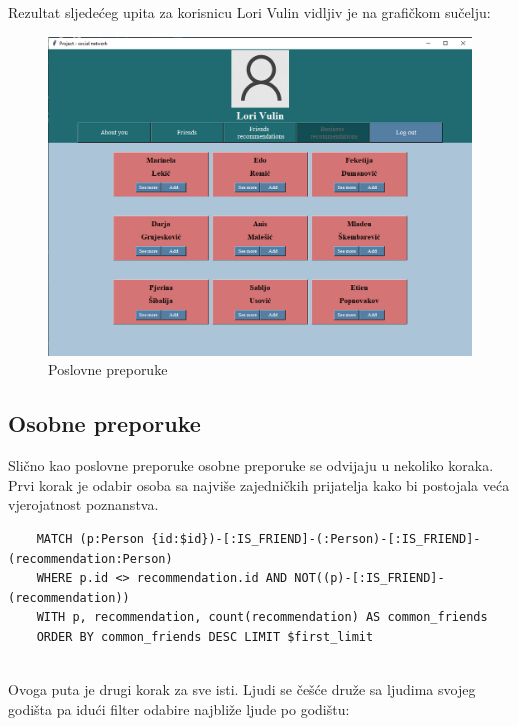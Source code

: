 \documentclass[titlepage, 12pt]{scrartcl}
\begin{document}
	\newpage
    \begin{samepage}
    Rezultat sljedećeg upita za korisnicu Lori Vulin vidljiv je na grafičkom sučelju:
    
    \begin{figure}[h!]
        \centering
        \includegraphics[scale=0.4]{slike/business.jpg}
        \caption{Poslovne preporuke}
        \label{fig:business_rec}
    \end{figure}
    
    \subsection{Osobne preporuke}
    Slično kao poslovne preporuke osobne preporuke se odvijaju u nekoliko koraka. \\
    Prvi korak je odabir osoba sa najviše zajedničkih prijatelja kako bi postojala veća vjerojatnost poznanstva.
    \begin{samepage}
    \begin{verbatim}
    MATCH (p:Person {id:$id})-[:IS_FRIEND]-(:Person)-[:IS_FRIEND]-(recommendation:Person)
    WHERE p.id <> recommendation.id AND NOT((p)-[:IS_FRIEND]-(recommendation))
    WITH p, recommendation, count(recommendation) AS common_friends
    ORDER BY common_friends DESC LIMIT $first_limit
    
    \end{verbatim}
    \end{samepage}
    
    \end{samepage}
	Ovoga puta je drugi korak za sve isti. Ljudi se češće druže sa ljudima svojeg godišta pa idući filter odabire najbliže ljude po godištu:
\end{document}
